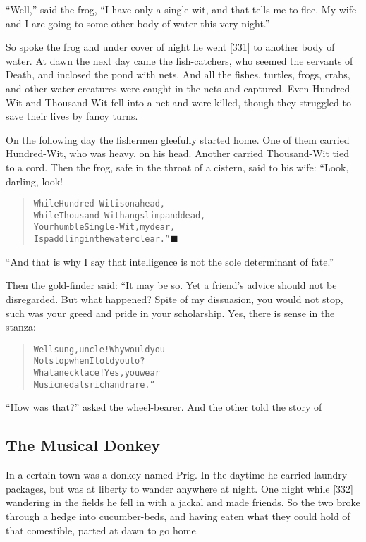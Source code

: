 \documentclass[article, twoside, 14pt]{memoir}
\newcommand{\qed}{\hfill \ensuremath{\blacksquare}}
\renewenvironment{verbatim}{%
\begin{quote}%
\vskip -10pt%
\begin{alltt}\normalfont\large}{\end{alltt}%
\end{quote}%
\vskip -10pt
} %
\begin{document}
``Well,'' said the frog,
``I have only a single wit, and that tells me to flee. My wife and I are going to some other body of water this very night.''

So spoke the frog and under cover of night he went [331] to another
body of water. At dawn the next day came the fish-catchers, who
seemed the servants of Death, and inclosed the pond with nets. And
all the fishes, turtles, frogs, crabs, and other water-creatures
were caught in the nets and captured. Even Hundred-Wit and
Thousand-Wit fell into a net and were killed, though they struggled
to save their lives by fancy turns.

On the following day the fishermen gleefully started home. One of
them carried Hundred-Wit, who was heavy, on his head. Another
carried Thousand-Wit tied to a cord. Then the frog, safe in the
throat of a cistern, said to his wife: “Look, darling, look!

\begin{verbatim}
While Hundred-Wit is on a head,
While Thousand-Wit hangs limp and dead,
Your humble Single-Wit, my dear,
Is paddling in the water clear.”\hyperref[s83]{\qed}
\end{verbatim}
``And that is why I say that intelligence is not the sole determinant of fate.''

Then the gold-finder said: “It may be so. Yet a friend's advice
should not be disregarded. But what happened? Spite of my
dissuasion, you would not stop, such was your greed and pride in
your scholarship. Yes, there is sense in the stanza:

\begin{verbatim}
Well sung, uncle! Why would you
Not stop when I told you to?
What a necklace! Yes, you wear
Music medals rich and rare.”
\end{verbatim}
``How was that?'' asked the wheel-bearer. And the other told the
story of

\subsection{The Musical Donkey}

\label{s84}

In a certain town was a donkey named Prig. In the daytime he
carried laundry packages, but was at liberty to wander anywhere at
night. One night while [332] wandering in the fields he fell in
with a jackal and made friends. So the two broke through a hedge
into cucumber-beds, and having eaten what they could hold of that
comestible, parted at dawn to go home.
\end{document}

